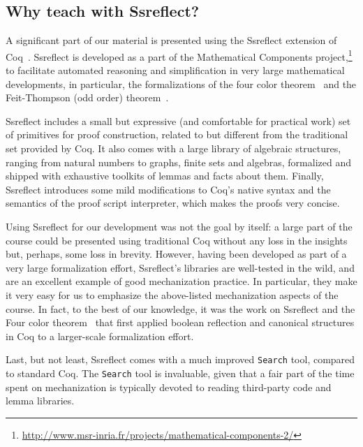 \documentclass[blockstyle,preprint]{sigplanconf}
\newcommand{\code}[1]{\lstinline{#1}}
\begin{document}
\vspace{5pt}

\subsection{Why teach with Ssreflect?}
\label{sec:why-ssreflect}

A significant part of our material is presented using the Ssreflect
extension of Coq~\cite{Gonthier-al:TR}. Ssreflect is developed as a
part of the Mathematical Components
project,\footnote{\scriptsize{\url{http://www.msr-inria.fr/projects/mathematical-components-2/}}}
to facilitate automated reasoning and simplification in very large
mathematical developments, in particular, the formalizations of the
four color theorem~\cite{Gonthier:AMS08} and the Feit-Thompson (odd
order) theorem~\cite{Gonthier-al:ITP13}.

Ssreflect includes a small but expressive (and comfortable for
practical work) set of primitives for proof construction, related to
but different from the traditional set provided by Coq. It also comes
with a large library of algebraic structures, ranging from natural
numbers to graphs, finite sets and algebras, formalized and shipped
with exhaustive toolkits of lemmas and facts about them. Finally,
Ssreflect introduces some mild modifications to Coq's native syntax
and the semantics of the proof script interpreter, which makes the
proofs very concise.

Using Ssreflect for our development was not the goal by itself: a
large part of the course could be presented using traditional Coq
without any loss in the insights but, perhaps, some loss in brevity.
%
However, having been developed as part of a very large formalization
effort, Ssreflect's libraries are well-tested in the wild, and are an
excellent example of good mechanization practice. In particular, they
make it very easy for us to emphasize the above-listed mechanization
aspects of the course. In fact, to the best of our knowledge, it was
the work on Ssreflect and the Four color
theorem~\cite{Gonthier:AMS08,Garillot-al:TPHOL09,Garillot:PhD} that
first applied boolean reflection and canonical structures in Coq to a
larger-scale formalization effort.

Last, but not least, Ssreflect comes with a much improved
\code{Search} tool, compared to standard Coq. The \code{Search} tool
is invaluable, given that a fair part of the time spent on
mechanization is typically devoted to reading third-party code and
lemma libraries.
\end{document}
